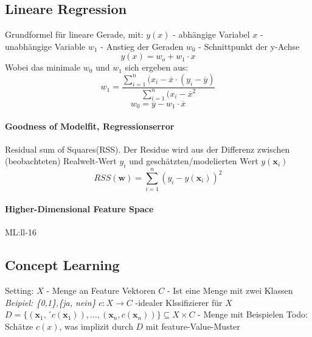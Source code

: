 \documentclass[11pt,a4paper]{article}
\begin{document}
\begin{flushleft}
\subsection{Lineare Regression}

Grundformel für lineare Gerade, mit: \newline
$y(x)$ - abhängige Variabel
$x$ - unabhängige Variable
$w_1$ - Anstieg der Geraden
$w_0$ - Schnittpunkt der y-Achse
\begin{equation}
    y(x)=w_o+w_1\cdot x
\end{equation}
Wobei das minimale $w_0$ und $w_1$ sich ergeben aus:
\begin{equation}
    w_1=\frac{\sum\limits^{n}_{i=1}(x_i-\overline{x}\cdot(y_i-\overline{y})}{\sum\limits_{i=1}^{n}(x_i-\overline{x}^2}
\end{equation}
\begin{equation}
    w_0=\overline{y}-w_1\cdot\overline{x}
\end{equation}

\paragraph{Goodness of Modelfit, Regressionserror}
Residual sum of Squares(RSS). \newline
Der Residue wird aus der Differenz zwischen (beobachteten) Realwelt-Wert $y_i$ und geschätzten/modelierten Wert $y(\mathbf{x}_i)$
\begin{equation}
    RSS(\mathbf{w}) = \sum^{n}_{i=1}(y_i-y(\mathbf{x}_i))^2
\end{equation}

\paragraph{Higher-Dimensional Feature Space} ML:ll-16


\subsection{Concept Learning}
Setting:\newline
$X$ - Menge an Feature Vektoren\newline
$C$ - Ist eine Menge mit zwei Klassen \textit{Beipiel: \{0,1\},\{ja, nein\}} \newline
$c: X \rightarrow C$ -idealer Klssifizierer für $X$ \newline
$D=\{(\mathbf{x}_1,´c(\mathbf{x}_1)),\dots,(\mathbf{x}_n,c(\mathbf{x}_n))\} \subseteq X \times C$ - Menge mit Beispielen \newline
Todo: \newline
Schätze $c(x)$, was implizit durch $D$ mit feature-Value-Muster



\end{flushleft}
\end{document}
